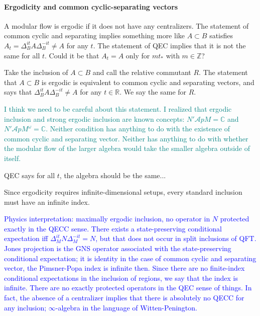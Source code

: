 \documentclass[a4paper,11pt]{article}
\theoremstyle{definition}
\newcommand{\NL}[1]{\textcolor{blue}{#1}}
\newcommand{\YC}[1]{\textcolor{teal}{#1}}
\begin{document}
\paragraph{Ergodicity and common cyclic-separating vectors}\label{subsection:common}

A modular flow is ergodic if it does not have any centralizers. The statement of common cyclic and separating implies something more like $A\subset B$ satisfies $A_t=\Delta_B^{it} A \Delta_B^{-it} \neq A$ for any $t$. The statement of QEC implies that it is not the same for all $t$. Could it be that $A_t=A$ only for $m t_*$ with $m\in \mathbb{Z}$?

Take the inclusion of $A\subset B$ and call the relative commutant $R$. The statement that $A\subset B$ is ergodic is equivalent to common cyclic and separating vectors, and says that $\Delta_B^{it}A \Delta_B^{-it}\neq A$ for any $t\in \mathbb{R}$. We say the same for $R$. 

\YC{I think we need to be careful about this statement. I realized that ergodic inclusion and strong ergodic inclusion are known concepts: $N'\mathcal{A}p M = \mathbb{C}$ and $N'\mathcal{A}p M^\omega = \mathbb{C}$. Neither condition has anything to do with the existence of common cyclic and separating vector. Neither has anything to do with whether the modular flow of the larger algebra would take the smaller algebra outside of itself. }

QEC says for all $t$, the algebra should be the same...

Since ergodicity requires infinite-dimensional setups, every standard inclusion must have an infinite index. 





\NL{Physics interpretation: maximally ergodic inclusion, no operator in $N$ protected exactly in the QECC sense. There exists a state-preserving conditional expectation iff $\Delta_M^{it}N\Delta_M^{-it}=N$, but that does not occur in split inclusions of QFT. Jones projection is the GNS operator associated with the state-preserving conditional expectation; it is identity in the case of common cyclic and separating vector, the Pimsner-Popa index is infinite then. Since there are no finite-index conditional expectations in the inclusion of regions, we say that the index is infinite. There are no exactly protected operators in the QEC sense of things. In fact, the absence of a centralizer implies that there is absolutely no QECC for any inclusion; $\infty$-algebra in the language of Witten-Penington.}
\end{document}
